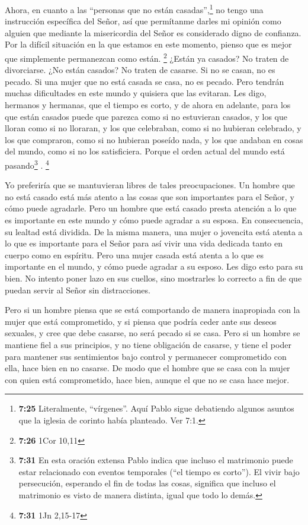  Ahora, en cuanto a las ``personas que no están
casadas'',\footnote{\textbf{7:25} Literalmente, ``vírgenes''. Aquí Pablo
  sigue debatiendo algunos asuntos que la iglesia de corinto había
  planteado. Ver 7:1.} no tengo una instrucción específica del Señor,
así que permítanme darles mi opinión como alguien que mediante la
misericordia del Señor es considerado digno de confianza.
 Por la difícil situación en la que estamos en este
momento, pienso que es mejor que simplemente permanezcan como están.
\footnote{\textbf{7:26} 1Cor 10,11}  ¿Están ya casados?
No traten de divorciarse. ¿No están casados? No traten de casarse.
 Si no se casan, no es pecado. Si una mujer que no está
casada se casa, no es pecado. Pero tendrán muchas dificultades en este
mundo y quisiera que las evitaran.  Les digo, hermanos y
hermanas, que el tiempo es corto, y de ahora en adelante, para los que
están casados puede que parezca como si no estuvieran casados,
 y los que lloran como si no lloraran, y los que
celebraban, como si no hubieran celebrado, y los que compraron, como si
no hubieran poseído nada,  y los que andaban en cosas del
mundo, como si no los satisficiera. Porque el orden actual del mundo
está pasando\footnote{\textbf{7:31} En esta oración extensa Pablo indica
  que incluso el matrimonio puede estar relacionado con eventos
  temporales (``el tiempo es corto''). El vivir bajo persecución,
  esperando el fin de todas las cosas, significa que incluso el
  matrimonio es visto de manera distinta, igual que todo lo demás.} .
\footnote{\textbf{7:31} 1Jn 2,15-17}

 Yo preferiría que se mantuvieran libres de tales
preocupaciones. Un hombre que no está casado está más atento a las cosas
que son importantes para el Señor, y cómo puede agradarle.
 Pero un hombre que está casado presta atención a lo que
es importante en este mundo y cómo puede agradar a su esposa.
 En consecuencia, su lealtad está dividida. De la misma
manera, una mujer o jovencita está atenta a lo que es importante para el
Señor para así vivir una vida dedicada tanto en cuerpo como en espíritu.
Pero una mujer casada está atenta a lo que es importante en el mundo, y
cómo puede agradar a su esposo.  Les digo esto para su
bien. No intento poner lazo en sus cuellos, sino mostrarles lo correcto
a fin de que puedan servir al Señor sin distracciones.

 Pero si un hombre piensa que se está comportando de
manera inapropiada con la mujer que está comprometido, y si piensa que
podría ceder ante sus deseos sexuales, y cree que debe casarse, no será
pecado si se casa.  Pero si un hombre se mantiene fiel a
sus principios, y no tiene obligación de casarse, y tiene el poder para
mantener sus sentimientos bajo control y permanecer comprometido con
ella, hace bien en no casarse.  De modo que el hombre que
se casa con la mujer con quien está comprometido, hace bien, aunque el
que no se casa hace mejor.

